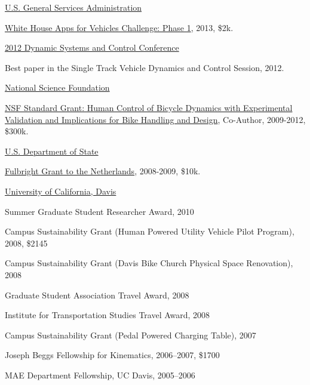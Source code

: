 \documentclass[10pt]{article}
\newenvironment{innerlist}[1][\enskip\textbullet]%
        {\begin{compactitem}[#1]}{\end{compactitem}}
\newcommand{\blankline}{\quad\pagebreak[2]}
\begin{document}
\blankline

\href{http://gsa.gov/}{U.S. General Services Administration}
\begin{innerlist}
  \item \href{http://appsforvehicles.challenge.gov/}{White House Apps for
    Vehicles Challenge: Phase 1}, 2013, \$2k.
\end{innerlist}

\blankline

\href{http://mne.psu.edu/dscc2012/}{2012 Dynamic Systems and Control Conference}
\begin{innerlist}
  \item Best paper in the Single Track Vehicle Dynamics and Control Session,
    2012.
\end{innerlist}

\blankline

\href{http://nsf.gov/}{National Science Foundation}
\begin{innerlist}
  \item \href{http://nsf.gov/awardsearch/showAward.do?AwardNumber=0928339}{NSF
    Standard Grant: Human Control of Bicycle Dynamics with Experimental
    Validation and Implications for Bike Handling and Design}, Co-Author,
    2009-2012, \$300k.
\end{innerlist}

\blankline

\href{http://exchanges.state.gov/}{U.S. Department of State}
\begin{innerlist}
  \item \href{http://fulbright.state.gov/}{Fulbright Grant to the Netherlands},
    2008-2009, \$10k.
\end{innerlist}

\blankline

\href{http://www.ucdavis.edu}{University of California, Davis}
\begin{innerlist}
  \item Summer Graduate Student Researcher Award, 2010
  \item Campus Sustainability Grant (Human Powered Utility Vehicle Pilot
    Program), 2008, \$2145
  \item Campus Sustainability Grant (Davis Bike Church Physical Space Renovation), 2008
  \item Graduate Student Association Travel Award, 2008
  \item Institute for Transportation Studies Travel Award, 2008
  \item Campus Sustainability Grant (Pedal Powered Charging Table), 2007
  \item Joseph Beggs Fellowship for Kinematics, 2006--2007, \$1700
  \item MAE Department Fellowship, UC Davis, 2005--2006
\end{innerlist}
\end{document}
